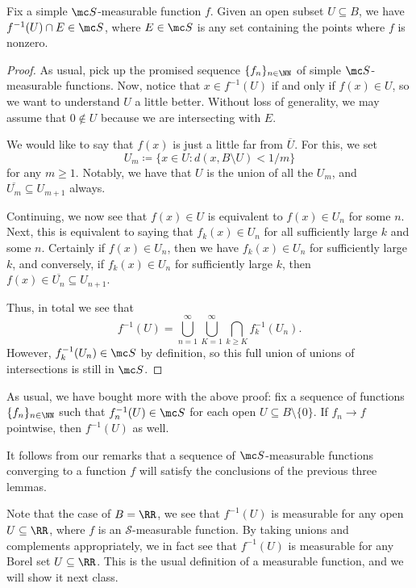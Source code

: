 \documentclass[../notes.tex]{subfiles}
\begin{document}
\begin{lemma}
	Fix a simple $\mc S$-measurable function $f$. Given an open subset $U\subseteq B$, we have $f^{-1}(U)\cap E\in\mc S$, where $E\in\mc S$ is any set containing the points where $f$ is nonzero.
\end{lemma}
\begin{proof}
	As usual, pick up the promised sequence $\{f_n\}_{n\in\NN}$ of simple $\mc S$-measurable functions. Now, notice that $x\in f^{-1}(U)$ if and only if $f(x)\in U$, so we want to understand $U$ a little better. Without loss of generality, we may assume that $0\notin U$ because we are intersecting with $E$.

	We would like to say that $f(x)$ is just a little far from $\overline U$. For this, we set
	\[U_m\coloneqq\{x\in U:d(x,B\setminus U)<1/m\}\]
	for any $m\ge1$. Notably, we have that $U$ is the union of all the $U_m$, and $\overline{U_m}\subseteq U_{m+1}$ always.

	Continuing, we now see that $f(x)\in U$ is equivalent to $f(x)\in U_n$ for some $n$. Next, this is equivalent to saying that $f_k(x)\in U_n$ for all sufficiently large $k$ and some $n$. Certainly if $f(x)\in U_n$, then we have $f_k(x)\in U_n$ for sufficiently large $k$, and conversely, if $f_k(x)\in U_n$ for sufficiently large $k$, then $f(x)\in\overline{U_n}\subseteq U_{n+1}$.

	Thus, in total we see that
	\[f^{-1}(U)=\bigcup_{n=1}^\infty\bigcup_{K=1}^\infty\bigcap_{k\ge K}f_k^{-1}(U_n).\]
	However, $f_k^{-1}(U_n)\in\mc S$ by definition, so this full union of unions of intersections is still in $\mc S$.
\end{proof}
\begin{remark}
	As usual, we have bought more with the above proof: fix a sequence of functions $\{f_n\}_{n\in\NN}$ such that $f_n^{-1}(U)\in\mc S$ for each open $U\subseteq B\setminus\{0\}$. If $f_n\to f$ pointwise, then $f^{-1}(U)$ as well.
\end{remark}
\begin{remark}
	It follows from our remarks that a sequence of $\mc S$-measurable functions converging to a function $f$ will satisfy the conclusions of the previous three lemmas.
\end{remark}
\begin{remark}
	Note that the case of $B=\RR$, we see that $f^{-1}(U)$ is measurable for any open $U\subseteq\RR$, where $f$ is an $\mathcal S$-measurable function. By taking unions and complements appropriately, we in fact see that $f^{-1}(U)$ is measurable for any Borel set $U\subseteq\RR$. This is the usual definition of a measurable function, and we will show it next class.
\end{remark}
\end{document}
